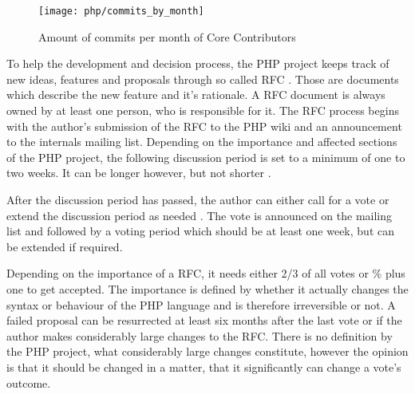 \begin{figure}[htbp]
  \centering
  \texttt{[image: php/commits\_by\_month]}
  \caption{Amount of commits per month of Core Contributors}
\end{figure}

To help the development and decision process, the PHP project keeps track of
new ideas, features and proposals through so called \ac{RFC} \cite{PHPRFC}.
Those are documents which describe the new feature and it's rationale. A
\ac{RFC} document is always owned by at least one person, who is responsible
for it. The \ac{RFC} process begins with the author's submission of the
\ac{RFC} to the PHP wiki and an announcement to the internals mailing list.
Depending on the importance and affected sections of the PHP project, the
following discussion period is set to a minimum of one to two weeks. It can be
longer however, but not shorter \cite{PHPVoting}.

After the discussion period has passed, the author can either call for a vote
or extend the discussion period as needed \cite{PHPVoting}. The vote is
announced on the mailing list and followed by a voting period which should be
at least one week, but can be extended if required.

Depending on the importance of a \ac{RFC}, it needs either 2/3 of all votes or
\unit[50]{\%} plus one to get accepted. The importance is defined by whether it
actually changes the syntax or behaviour of the PHP language and is therefore
irreversible or not. A failed proposal can be resurrected at least six months
after the last vote or if the author makes considerably large changes to the
\ac{RFC}. There is no definition by the PHP project, what considerably large
changes constitute, however the opinion is that it should be changed in a
matter, that it significantly can change a vote's outcome.

